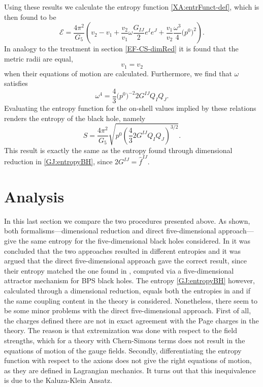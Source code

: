 \documentclass[12pt,twoside]{book}
\begin{document}
Using these results we calculate the entropy function \eqref{XA:entrFunct-def}, which is then found to be
\begin{equation}\label{XA:entropyFunc}
\mathcal{E} = \frac{4\pi^{2}}{G_{5}}\left(
v_{2} - v_{1} + \frac{v_{2}}{v_{1}}\omega \frac{G_{IJ}}{2} e^{I} e^{J}
+ \frac{v_{1}}{v_{2}} \frac{\omega^{3}}{4} \big( p^{0} \big)^{2}
\right).
\end{equation}
In analogy to the treatment in section \ref{EF-CS-dimRed} it is found that the metric radii are equal,
\begin{equation}
v_{1} = v_{2}
\end{equation}
when their equations of motion are calculated. Furthermore, we find that $\omega$ satisfies
\begin{equation}
\omega^{4} = \frac{4}{3} \big( p^{0} \big)^{-2} 2G^{IJ} Q_{I} Q_{J}.
\end{equation}
Evaluating the entropy function for the on-shell values implied by these relations renders the entropy of the black hole, namely
\begin{equation}\label{XA:entropy5D}
S = \frac{4\pi^{2}}{G_{5}} \sqrt{p^{0} \left( \frac{4}{3} 2G^{IJ} Q_{I} Q_{J} \right)^{3/2}}.
\end{equation}
This result is exactly the same as the entropy found through dimensional reduction in \eqref{GJ:entropyBH}, since $2G^{IJ} = \hat{f}^{IJ}$.

\section{Analysis}

In this last section we compare the two procedures presented above. As shown, both formalisms---dimensional reduction and direct five-dimensional approach---give the same entropy for the five-dimensional black holes considered. In \cite{Arsiwalla:2008gc} it was concluded that the two approaches resulted in different entropies and it was argued that the direct five-dimensional approach gave the correct result, since their entropy matched the one found in \cite{Larsen:2006xm}, computed via a five-dimensional attractor mechanism for BPS black holes. The entropy \eqref{GJ:entropyBH} however, calculated through a dimensional reduction, equals both the entropies in \cite{Arsiwalla:2008gc} and \cite{Larsen:2006xm} if the same coupling content in the theory is considered. Nonetheless, there seem to be some minor problems with the direct five-dimensional approach. First of all, the charges defined there are not in exact agreement with the Page charges in the theory. The reason is that extremization was done with respect to the field strengths, which for a theory with Chern-Simons terms does not result in the equations of motion of the gauge fields. Secondly, differentiating the entropy function with respect to the axions does not give the right equations of motion, as they are defined in Lagrangian mechanics. It turns out that this inequivalence is due to the Kaluza-Klein Ansatz.\newline
\end{document}
